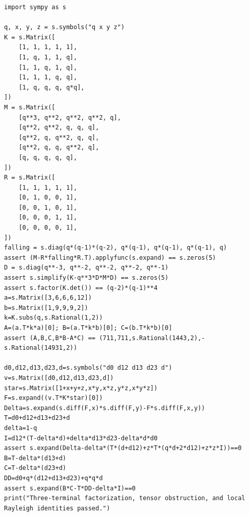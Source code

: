 \documentclass[11pt,a4paper]{article}
\theoremstyle{definition}
\theoremstyle{remark}\newtheorem{remark}[theorem]{Remark}
\begin{document}
\begin{lstlisting}
import sympy as s

q, x, y, z = s.symbols("q x y z")
K = s.Matrix([
    [1, 1, 1, 1, 1],
    [1, q, 1, 1, q],
    [1, 1, q, 1, q],
    [1, 1, 1, q, q],
    [1, q, q, q, q*q],
])
M = s.Matrix([
    [q**3, q**2, q**2, q**2, q],
    [q**2, q**2, q, q, q],
    [q**2, q, q**2, q, q],
    [q**2, q, q, q**2, q],
    [q, q, q, q, q],
])
R = s.Matrix([
    [1, 1, 1, 1, 1],
    [0, 1, 0, 0, 1],
    [0, 0, 1, 0, 1],
    [0, 0, 0, 1, 1],
    [0, 0, 0, 0, 1],
])
falling = s.diag(q*(q-1)*(q-2), q*(q-1), q*(q-1), q*(q-1), q)
assert (M-R*falling*R.T).applyfunc(s.expand) == s.zeros(5)
D = s.diag(q**-3, q**-2, q**-2, q**-2, q**-1)
assert s.simplify(K-q**3*D*M*D) == s.zeros(5)
assert s.factor(K.det()) == (q-2)*(q-1)**4
a=s.Matrix([3,6,6,6,12])
b=s.Matrix([1,9,9,9,2])
k=K.subs(q,s.Rational(1,2))
A=(a.T*k*a)[0]; B=(a.T*k*b)[0]; C=(b.T*k*b)[0]
assert (A,B,C,B*B-A*C) == (711,711,s.Rational(1443,2),-s.Rational(14931,2))

d0,d12,d13,d23,d=s.symbols("d0 d12 d13 d23 d")
v=s.Matrix([d0,d12,d13,d23,d])
star=s.Matrix([1+x+y+z,x*y,x*z,y*z,x*y*z])
F=s.expand((v.T*K*star)[0])
Delta=s.expand(s.diff(F,x)*s.diff(F,y)-F*s.diff(F,x,y))
T=d0+d12+d13+d23+d
delta=1-q
I=d12*(T-delta*d)+delta*d13*d23-delta*d*d0
assert s.expand(Delta-delta*(T*(d+d12)+z*T*(q*d+2*d12)+z*z*I))==0
B=T-delta*(d13+d)
C=T-delta*(d23+d)
DD=d0+q*(d12+d13+d23)+q*q*d
assert s.expand(B*C-T*DD-delta*I)==0
print("Three-terminal factorization, tensor obstruction, and local Rayleigh identities passed.")


\end{lstlisting}
\end{document}

